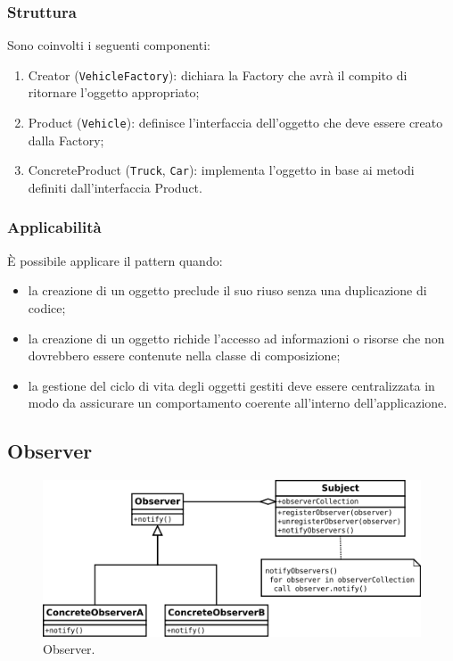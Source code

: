 \subsubsection{Struttura} Sono coinvolti i seguenti componenti:
\begin{enumerate}
	\item Creator (\texttt{VehicleFactory}): dichiara la Factory che avrà il compito di ritornare l'oggetto appropriato;
	\item Product (\texttt{Vehicle}): definisce l'interfaccia dell'oggetto che deve essere creato dalla Factory;
	\item ConcreteProduct (\texttt{Truck}, \texttt{Car}): implementa l'oggetto in base ai metodi  definiti dall'interfaccia Product.
\end{enumerate}

\subsubsection{Applicabilità} È possibile applicare il pattern quando:
\begin{itemize}
	\item la creazione di un oggetto preclude il suo riuso senza una duplicazione di codice;
	\item la creazione di un oggetto richide l'accesso ad informazioni o risorse che non dovrebbero essere contenute nella classe di composizione;
	\item la gestione del ciclo di vita degli oggetti gestiti deve essere centralizzata in modo da assicurare un comportamento coerente all'interno dell'applicazione.
\end{itemize}

\subsection{Observer}

\begin{figure}[H] \label{fig:observer}
	\includegraphics[scale=0.6]{img/observer.png}
	\caption{Observer.}
\end{figure}

